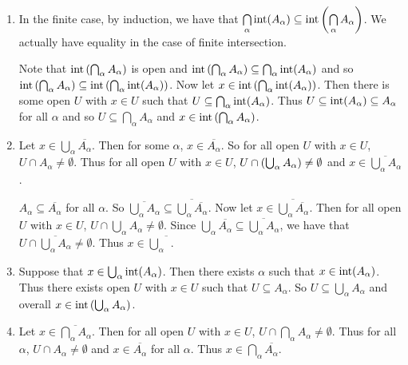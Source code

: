 \documentclass[letterpaper, 11pt, oneside]{book}
\begin{document}
\begin{pf}\
  \begin{enumerate}
  \item In the finite case, by induction, we have that $\Bigcap_{\alpha} \inte(A_{\alpha}) \subseteq \inte\pqty{\Bigcap_{\alpha} A_{\alpha}}$.
        We actually have equality in the case of finite intersection.

        Note that $\inte\pqty{\bigcap_{\alpha} A_{\alpha}}$ is open and $\inte\pqty{\bigcap_{\alpha} A_{\alpha}} \subseteq \bigcap_{\alpha} \inte(A_{\alpha})$ and so $\inte\pqty{\bigcap_{\alpha} A_{\alpha}} \subseteq \inte\pqty{\bigcap_{\alpha} \inte(A_{\alpha})}$.
        Now let $x \in \inte\pqty{\bigcap_{\alpha} \inte(A_{\alpha})}$.
        Then there is some open $U$ with $x \in U$ such that $U \subseteq \bigcap_{\alpha} \operatorname{int}(A_{\alpha})$.
        Thus $U \subseteq \operatorname{int}(A_{\alpha}) \subseteq A_{\alpha}$ for all $\alpha$ and so $U \subseteq \bigcap_{\alpha} A_{\alpha}$ and $x \in \inte\pqty{\bigcap_{\alpha} A_{\alpha}}$.
  \item Let $x \in \bigcup_{\alpha} \overline{A_{\alpha}}$.
        Then for some $\alpha$, $x \in \overline{A_{\alpha}}$.
        So for all open $U$ with $x \in U$, $U \cap A_{\alpha} \neq \emptyset$.
        Thus for all open $U$ with $x \in U$, $U \cap \pqty{\bigcup_{\alpha} A_{\alpha}} \neq \emptyset$ and $x \in \overline{\bigcup_{\alpha} A_{\alpha}}$.

        $A_{\alpha} \subseteq \overline{A_{\alpha}}$ for all $\alpha$.
        So $\overline{\bigcup_{\alpha} A_{\alpha}} \subseteq \overline{\bigcup_{\alpha} \overline{A_{\alpha}}}$.
        Now let $x \in \overline{\bigcup_{\alpha} \overline{A_{\alpha}}}$.
        Then for all open $U$ with $x \in U$, $U \cap \bigcup_{\alpha} A_{\alpha} \neq \emptyset$.
        Since $\bigcup_{\alpha} \overline{A_{\alpha}} \subseteq \overline{\bigcup_{\alpha} A_{\alpha}}$, we have that $U \cap \overline{\bigcup_{\alpha} A_{\alpha}} \neq \emptyset$.
        Thus $x \in \overline{\bigcup_{\alpha}}$.
  \item Suppose that $x \in \bigcup_{\alpha} \operatorname{int}(A_{\alpha})$.
        Then there exists $\alpha$ such that $x \in \operatorname{int}(A_{\alpha})$.
        Thus there exists open $U$ with $x \in U$ such that $U \subseteq A_{\alpha}$.
        So $U \subseteq \bigcup_{\alpha} A_{\alpha}$ and overall $x \in \inte\pqty{\bigcup_{\alpha} A_{\alpha}}$.
  \item Let $x \in \overline{\bigcap_{\alpha} A_{\alpha}}$.
        Then for all open $U$ with $x \in U$, $U \cap \bigcap_{\alpha} A_{\alpha} \neq \emptyset$.
        Thus for all $\alpha$, $U \cap A_{\alpha} \neq \emptyset$ and $x \in \overline{A_{\alpha}}$ for all $\alpha$.
        Thus $x \in \bigcap_{\alpha} \overline{A_{\alpha}}$.
  \end{enumerate}
\end{pf}
\end{document}
